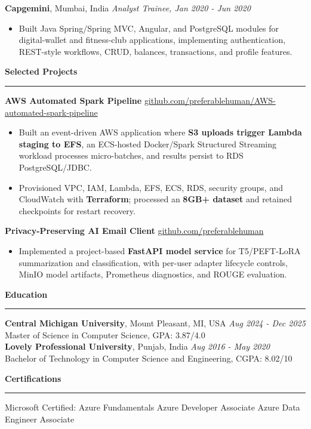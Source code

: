 \documentclass[11pt,letterpaper]{article}
\newcommand{\ressection}[1]{\Needspace{6\baselineskip}\vspace{8pt}\par\textbf{#1}\par\vspace{2pt}\hrule\vspace{5pt}}
\begin{document}
\textbf{Capgemini}, Mumbai, India \hfill \textit{Analyst Trainee, Jan 2020 - Jun 2020}
\begin{itemize}
  \item Built Java Spring/Spring MVC, Angular, and PostgreSQL modules for digital-wallet and fitness-club applications, implementing authentication, REST-style workflows, CRUD, balances, transactions, and profile features.
\end{itemize}

\ressection{Selected Projects}
\textbf{AWS Automated Spark Pipeline} \hfill \href{https://github.com/preferablehuman/AWS-automated-spark-pipeline}{github.com/preferablehuman/AWS-automated-spark-pipeline}
\begin{itemize}
  \item Built an event-driven AWS application where \textbf{S3 uploads trigger Lambda staging to EFS}, an ECS-hosted Docker/Spark Structured Streaming workload processes micro-batches, and results persist to RDS PostgreSQL/JDBC.
  \item Provisioned VPC, IAM, Lambda, EFS, ECS, RDS, security groups, and CloudWatch with \textbf{Terraform}; processed an \textbf{8GB+ dataset} and retained checkpoints for restart recovery.
\end{itemize}
\vspace{2pt}
\textbf{Privacy-Preserving AI Email Client} \hfill \href{https://github.com/preferablehuman}{github.com/preferablehuman}
\begin{itemize}
  \item Implemented a project-based \textbf{FastAPI model service} for T5/PEFT-LoRA summarization and classification, with per-user adapter lifecycle controls, MinIO model artifacts, Prometheus diagnostics, and ROUGE evaluation.
\end{itemize}

\ressection{Education}
\textbf{Central Michigan University}, Mount Pleasant, MI, USA \hfill \textit{Aug 2024 - Dec 2025}\\
Master of Science in Computer Science, GPA: 3.87/4.0\\[2pt]
\textbf{Lovely Professional University}, Punjab, India \hfill \textit{Aug 2016 - May 2020}\\
Bachelor of Technology in Computer Science and Engineering, CGPA: 8.02/10

\ressection{Certifications}
Microsoft Certified: Azure Fundamentals \textbar{} Azure Developer Associate \textbar{} Azure Data Engineer Associate
\end{document}
